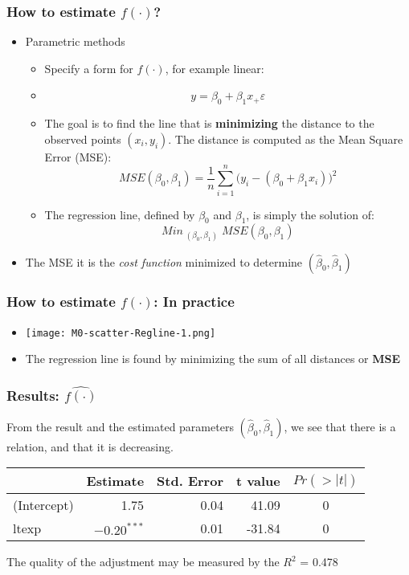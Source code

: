 \documentclass[xcolor=x11names,compress, aspectratio=169]{beamer}
\renewcommand{\(}{\begin{columns}}
\renewcommand{\)}{\end{columns}}
\newcommand{\<}[1]{\begin{column}{#1}}
\renewcommand{\>}{\end{column}}
\begin{document}
\begin{frame} %
\frametitle{How to estimate $f(\cdot)$?}
 \begin{itemize}
  \item<+-> Parametric methods
   \begin{itemize}
      \item<+->[] Specify a form for $f(\cdot)$, for example linear:
      \item<+->[] $$y = \beta_0 + \beta_1 x_ + \varepsilon$$
      \item<+-> The goal is to find the line that is  \textbf{minimizing} the distance to the observed points $(x_i, y_i)$.
                The distance is computed as the Mean Square Error (MSE): $$ MSE(\beta_0, \beta_1) = \frac{1}{n} \sum_{i=1}^{n} \bigl(y_i - (\beta_0 + \beta_1 x_i)\bigr)^2 $$
      \item<+-> The regression line, defined by $\beta_0$ and $\beta_1$,  is simply the solution of:
       $$Min_{\; (\beta_0 , \beta_1)} \; MSE(\beta_0, \beta_1) $$
   \end{itemize}
 \item<+->[]  The MSE it is the \textit{cost function} minimized to determine $ (\widehat \beta_0, \widehat \beta_1)$
 \end{itemize}

\end{frame}



\begin{frame} %
\frametitle{How to estimate $f(\cdot)$: In practice}
 \begin{itemize}
  \item<+->[] \texttt{[image: M0-scatter-Regline-1.png]}
  \item<+->[] The regression line is found by minimizing the sum of all distances or \textbf{MSE}
 \end{itemize}
\end{frame}


\begin{frame} %
\frametitle{Results: $ \widehat{f(\cdot)}$}
From the result and the estimated  parameters $ (\widehat \beta_0, \widehat \beta_1)$, we see that there is a relation, and that it is decreasing.
\begin{table}
\centering
\begin{tabular}{l|rrrc}
\hline
  & Estimate & Std. Error & t value & $Pr(>|t|)$\\
\hline
(Intercept) & 1.75 & 0.04 & 41.09 & 0\\
\hline
ltexp &\textbf{ $-0.20^{***}$ }& 0.01 & -31.84 & 0\\
\hline
\end{tabular}
\end{table}
\vspace{0.5cm}
 The quality of the adjustment may be measured by the $R^2$ = 0.478

\end{frame}
\end{document}
